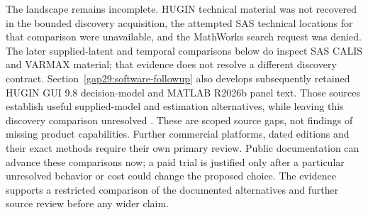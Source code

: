 The landscape remains incomplete. HUGIN technical material was not recovered
in the bounded discovery acquisition, the attempted SAS technical locations
for that comparison were unavailable, and the MathWorks search request was
denied. The later supplied-latent and temporal comparisons below do inspect
SAS CALIS and VARMAX material; that evidence does not resolve a different
discovery contract. Section~\ref{gap29:software-followup} also develops
subsequently retained HUGIN GUI 9.8 decision-model and MATLAB R2026b panel
text. Those sources establish useful supplied-model and estimation
alternatives, while leaving this discovery comparison unresolved
\citep{gap29hugin,gap29matlab}. These are scoped source gaps, not findings of
missing product capabilities. Further commercial
platforms, dated editions and their exact methods require their own primary
review. Public documentation can advance these comparisons now; a paid
trial is justified only after a particular unresolved behavior or cost could
change the proposed choice. The evidence supports a restricted comparison
of the documented alternatives and further source review before any wider claim.
\label{exec13:commercial-end}
